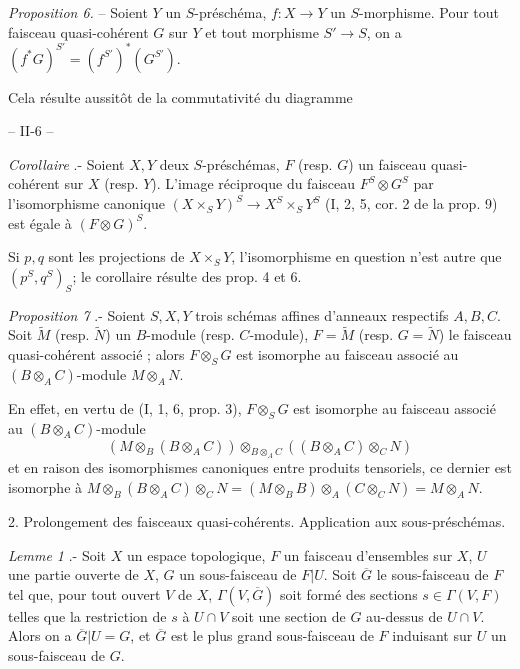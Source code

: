\noindent \textit{Proposition 6.} -- Soient $Y$ un $S$-préschéma, $f : X \to Y$ un $S$-morphisme. Pour tout faisceau quasi-cohérent $G$ sur $Y$ et tout morphisme $S' \to S$, on a $(f^*G)^{S'} = (f^{S'})^*(G^{S'})$.

Cela résulte aussitôt de la commutativité du diagramme

\newpage


-- II-6 --

\emph{Corollaire} .- Soient $X, Y$ deux $S$-préschémas, $F$ (resp. $G$) un faisceau quasi-cohérent sur $X$ (resp. $Y$). L'image réciproque du faisceau $F^S \otimes G^S$ par l'isomorphisme canonique $(X \times_S Y)^S \to X^S \times_S Y^S$ (I, 2, 5, cor. 2 de la prop. 9) est égale à $(F \otimes G)^S$.

Si $p, q$ sont les projections de $X \times_S Y$, l'isomorphisme en question n'est autre que $(p^S, q^S)_S$; le corollaire résulte des prop. 4 et 6.

\emph{Proposition 7} .- Soient $S, X, Y$ trois schémas affines d'anneaux respectifs $A, B, C$. Soit $\tilde{M}$ (resp. $\tilde{N}$) un $B$-module (resp. $C$-module), $F = \tilde{M}$ (resp. $G = \tilde{N}$) le faisceau quasi-cohérent associé ; alors $F \otimes_S G$ est isomorphe au faisceau associé au $(B \otimes_A C)$-module $M \otimes_A N$.

En effet, en vertu de (I, 1, 6, prop. 3), $F \otimes_S G$ est isomorphe au faisceau associé au $(B \otimes_A C)$-module
$$(M \otimes_B (B \otimes_A C)) \otimes_{B \otimes_A C} ((B \otimes_A C) \otimes_C N)$$
et en raison des isomorphismes canoniques entre produits tensoriels, ce dernier est isomorphe à $M \otimes_B (B \otimes_A C) \otimes_C N = (M \otimes_B B) \otimes_A (C \otimes_C N) = M \otimes_A N$.

2. Prolongement des faisceaux quasi-cohérents. Application aux sous-préschémas.

\emph{Lemme 1} .- Soit $X$ un espace topologique, $F$ un faisceau d'ensembles sur $X$, $U$ une partie ouverte de $X$, $G$ un sous-faisceau de $F|U$. Soit $\overline{G}$ le sous-faisceau de $F$ tel que, pour tout ouvert $V$ de $X$, $\Gamma(V, \overline{G})$ soit formé des sections $s \in \Gamma(V, F)$ telles que la restriction de $s$ à $U \cap V$ soit une section de $G$ au-dessus de $U \cap V$. Alors on a $\overline{G}|U = G$, et $\overline{G}$ est le plus grand sous-faisceau de $F$ induisant sur $U$ un sous-faisceau de $G$.


